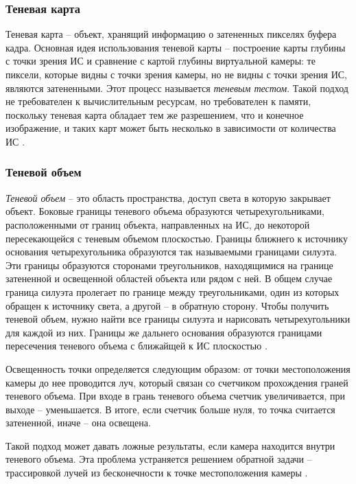 \subsubsection*{Теневая карта}

Теневая карта -- объект, хранящий информацию о затененных пикселях буфера кадра. Основная идея использования теневой карты -- построение карты глубины с точки зрения ИС и сравнение с картой глубины виртуальной камеры: те пиксели, которые видны с точки зрения камеры, но не видны с точки зрения ИС, являются затененными. Этот процесс называется \textit{теневым тестом}. Такой подход не требователен к вычислительным ресурсам, но требователен к памяти, поскольку теневая карта обладает тем же разрешением, что и конечное изображение, и таких карт может быть несколько в зависимости от количества ИС \cite{engel2008programming}.

\subsubsection*{Теневой объем}

\textit{Теневой объем} -- это область пространства, доступ света в которую закрывает объект. Боковые границы теневого объема образуются четырехугольниками, расположенными от границ объекта, направленных на ИС, до некоторой пересекающейся с теневым объемом плоскостью. Границы ближнего к источнику основания четырехугольника образуются так называемыми границами силуэта. Эти границы образуются сторонами треугольников, находящимися на границе затененной и освещенной областей объекта или рядом с ней. В общем случае граница силуэта пролегает по границе между треугольниками, один из которых обращен к источнику света, а другой -- в обратную сторону. Чтобы получить теневой объем, нужно найти все границы силуэта и нарисовать четырехугольники для каждой из них. Границы же дальнего основания образуются границами пересечения теневого объема с ближайщей к ИС плоскостью \cite{shad_vol}.

Освещенность точки определяется следующим образом: от точки местоположения камеры до нее проводится луч, который связан со счетчиком прохождения граней теневого объема. При входе в грань теневого объема счетчик увеличивается, при выходе -- уменьшается. В итоге, если счетчик больше нуля, то точка считается затененной, иначе -- она освещена.

Такой подход может давать ложные результаты, если камера находится внутри теневого объема. Эта проблема устраняется решением обратной задачи -- трассировкой лучей из бесконечности к точке местоположения камеры \cite{shad_vol}.

